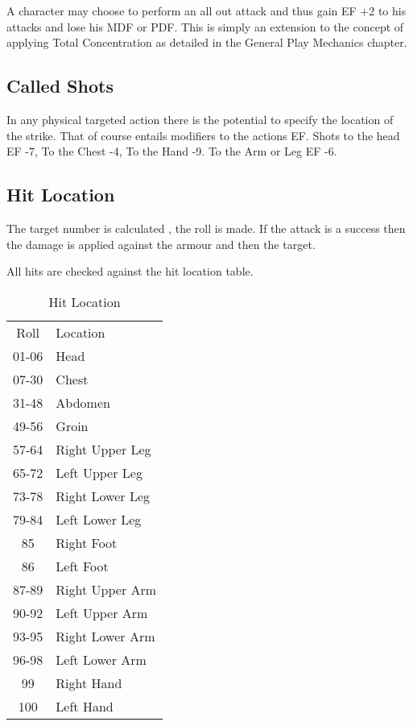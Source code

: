 A character may choose to perform an all out attack and thus gain 
EF +2 to his attacks and lose his MDF or PDF. This is simply an
extension to the concept of applying Total Concentration as detailed 
in the General Play Mechanics chapter.

\subsection{Called Shots}
 
In any physical targeted action there is the potential to specify the 
location of the strike. That of course entails modifiers to the 
actions EF. Shots to the head EF -7, To the Chest -4, To the Hand -9.
To the Arm or Leg EF -6.

\subsection{Hit Location}

The target number is calculated , the roll is made. If  the attack
is a success then the damage is applied against the armour and then
the target.

All hits are checked against the hit location table.

\begin{table}[hb]
\centering
\caption{Hit Location}
	\begin{tabular}{||c|l||} \hline
	Roll          &  Location \\
	01-06         &  Head \\
	07-30         &  Chest \\
	31-48         &  Abdomen \\
	49-56         &  Groin \\
	57-64         &  Right   Upper Leg \\
	65-72         &  Left    Upper Leg \\
	73-78         &  Right   Lower Leg \\
	79-84         &  Left    Lower Leg \\
	 85           &  Right   Foot \\
	 86           &  Left    Foot \\
	87-89         &  Right   Upper Arm \\
	90-92         &  Left    Upper Arm \\
	93-95         &  Right   Lower Arm \\
	96-98         &  Left    Lower Arm \\
	 99           &  Right   Hand \\
	 100          &  Left    Hand \\     \hline
	\end{tabular}
\end{table}


